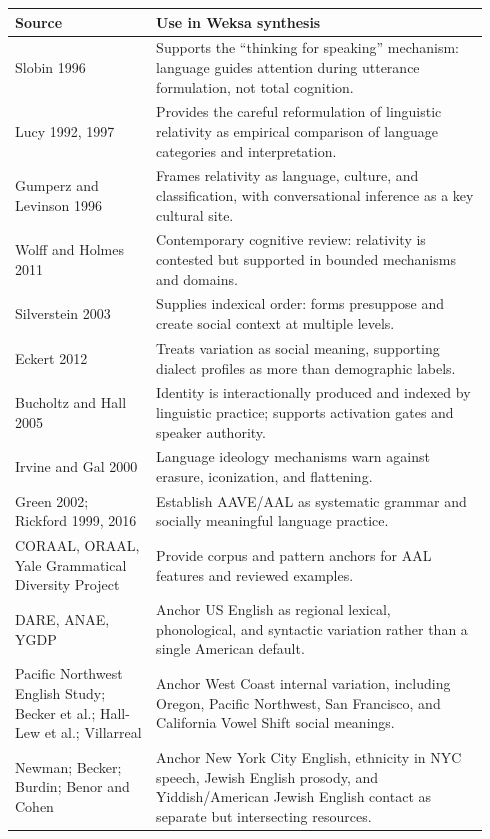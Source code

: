 \documentclass[11pt]{article}
\begin{document}
\begin{longtable}{>{\raggedright\arraybackslash}p{0.28\linewidth}
                  >{\raggedright\arraybackslash}p{0.66\linewidth}}
\textbf{Source} & \textbf{Use in Weksa synthesis} \\
\hline
Slobin 1996 & Supports the ``thinking for speaking'' mechanism: language
guides attention during utterance formulation, not total cognition. \\
Lucy 1992, 1997 & Provides the careful reformulation of linguistic relativity
as empirical comparison of language categories and interpretation. \\
Gumperz and Levinson 1996 & Frames relativity as language, culture, and
classification, with conversational inference as a key cultural site. \\
Wolff and Holmes 2011 & Contemporary cognitive review: relativity is contested
but supported in bounded mechanisms and domains. \\
Silverstein 2003 & Supplies indexical order: forms presuppose and create
social context at multiple levels. \\
Eckert 2012 & Treats variation as social meaning, supporting dialect profiles
as more than demographic labels. \\
Bucholtz and Hall 2005 & Identity is interactionally produced and indexed by
linguistic practice; supports activation gates and speaker authority. \\
Irvine and Gal 2000 & Language ideology mechanisms warn against erasure,
iconization, and flattening. \\
Green 2002; Rickford 1999, 2016 & Establish AAVE/AAL as systematic grammar and
socially meaningful language practice. \\
CORAAL, ORAAL, Yale Grammatical Diversity Project & Provide corpus and pattern
anchors for AAL features and reviewed examples. \\
DARE, ANAE, YGDP & Anchor US English as regional lexical, phonological, and
syntactic variation rather than a single American default. \\
Pacific Northwest English Study; Becker et al.; Hall-Lew et al.; Villarreal &
Anchor West Coast internal variation, including Oregon, Pacific Northwest, San
Francisco, and California Vowel Shift social meanings. \\
Newman; Becker; Burdin; Benor and Cohen & Anchor New York City English,
ethnicity in NYC speech, Jewish English prosody, and Yiddish/American Jewish
English contact as separate but intersecting resources. \\

\end{longtable}
\end{document}
